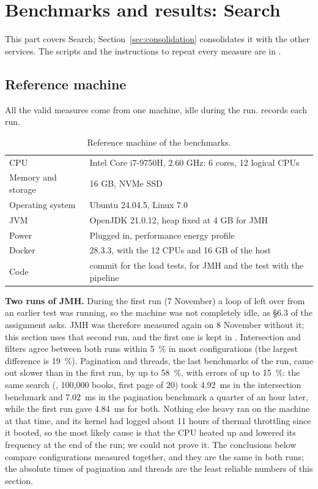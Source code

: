 \section{Benchmarks and results: Search}
\label{sec:benchmarks}

This part covers Search; Section~\ref{sec:consolidation} consolidates it with the other services. The scripts and
the instructions to repeat every measure are in .

\subsection{Reference machine}

All the valid measures come from one machine, idle during the run.  records each run.

\begin{table}[H]
\centering\small
\begin{tabularx}{\linewidth}{@{}L{3.2cm}X@{}}
\toprule
CPU & Intel Core i7-9750H, 2.60 GHz: 6 cores, 12 logical CPUs \\
Memory and storage & 16 GB, NVMe SSD \\
Operating system & Ubuntu 24.04.5, Linux 7.0 \\
JVM & OpenJDK 21.0.12, heap fixed at 4 GB for JMH \\
Power & Plugged in, performance energy profile \\
Docker & 28.3.3, with the 12 CPUs and 16 GB of the host \\
Code & commit  for the load tests,  for JMH and the test with the pipeline \\
\bottomrule
\end{tabularx}
\caption{Reference machine of the benchmarks.}
\end{table}

\textbf{Two runs of JMH.} During the first run (7 November) a loop of  left over from an earlier test
was running, so the machine was not completely idle, as \S6.3 of the assignment asks. JMH was therefore measured again
on 8 November without it; this section uses that second run, and the first one is kept in
. Intersection and filters agree between both runs within 5~\% in most configurations
(the largest difference is 19~\%). Pagination and threads, the last benchmarks of the run, came out slower than in the
first run, by up to 58~\%, with errors of up to 15~\%: the same search (, 100,000 books, first page of 20) took 4.92~ms in the
intersection benchmark and 7.02~ms in the pagination benchmark a quarter of an hour later, while the first run gave
4.84~ms for both. Nothing else heavy ran on the machine at that time, and its kernel had logged about 11 hours of
thermal throttling since it booted, so the most likely cause is that the CPU heated up and lowered its frequency at the
end of the run; we could not prove it. The conclusions below compare configurations measured together, and they are the same in both runs; the absolute times of
pagination and threads are the least reliable numbers of this section.

